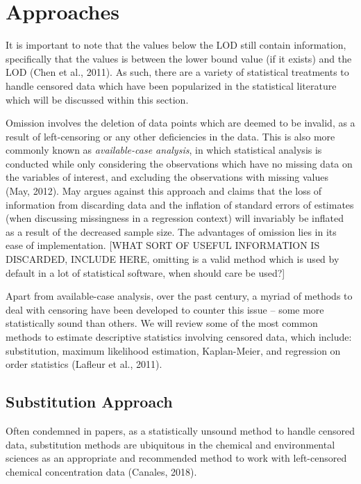 \documentclass[12pt, twoside]{amherstthesis}
\begin{document}
\hypertarget{Approaches}{%
\section{Approaches}\label{Approaches}}

It is important to note that the values below the LOD still contain information, specifically that the values is between the lower bound value (if it exists) and the LOD (Chen et al., 2011). As such, there are a variety of statistical treatments to handle censored data which have been popularized in the statistical literature which will be discussed within this section.

Omission involves the deletion of data points which are deemed to be invalid, as a result of left-censoring or any other deficiencies in the data. This is also more commonly known as \emph{available-case analysis}, in which statistical analysis is conducted while only considering the observations which have no missing data on the variables of interest, and excluding the observations with missing values (May, 2012). May argues against this approach and claims that the loss of information from discarding data and the inflation of standard errors of estimates (when discussing missingness in a regression context) will invariably be inflated as a result of the decreased sample size. The advantages of omission lies in its ease of implementation. {[}WHAT SORT OF USEFUL INFORMATION IS DISCARDED, INCLUDE HERE, omitting is a valid method which is used by default in a lot of statistical software, when should care be used?{]}

Apart from available-case analysis, over the past century, a myriad of methods to deal with censoring have been developed to counter this issue -- some more statistically sound than others. We will review some of the most common methods to estimate descriptive statistics involving censored data, which include: substitution, maximum likelihood estimation, Kaplan-Meier, and regression on order statistics (Lafleur et al., 2011).

\hypertarget{Substitution}{%
\subsection{Substitution Approach}\label{Substitution}}

Often condemned in papers, as a statistically unsound method to handle censored data, substitution methods are ubiquitous in the chemical and environmental sciences as an appropriate and recommended method to work with left-censored chemical concentration data (Canales, 2018).
\end{document}
